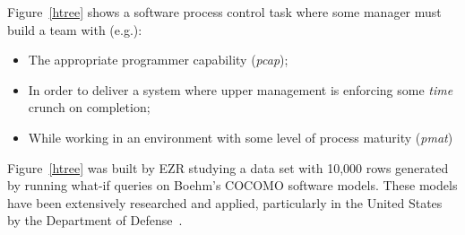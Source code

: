 \documentclass[AMA,STIX2COL]{WileyNJDv5}
\begin{document}
Figure~\ref{htree} shows a software process control task where some manager must 
build a team with (e.g.):
\begin{itemize}
\item
The appropriate programmer capability ({\em pcap});
\item
In order to deliver a system where upper management
is enforcing some   {\em time} crunch on  completion;
\item
While working
in an environment with some level of process maturity ({\em  pmat})
\end{itemize}
Figure~\ref{htree} was built by EZR studying  a data set with 10,000 rows
generated by running what-if queries
on Boehm's COCOMO software models. These models have been extensively
researched and applied, particularly in the United States by the
Department of Defense~\cite{Boehm,boehm2000cost,Boehm:2006,cocomo}.
\end{document}
